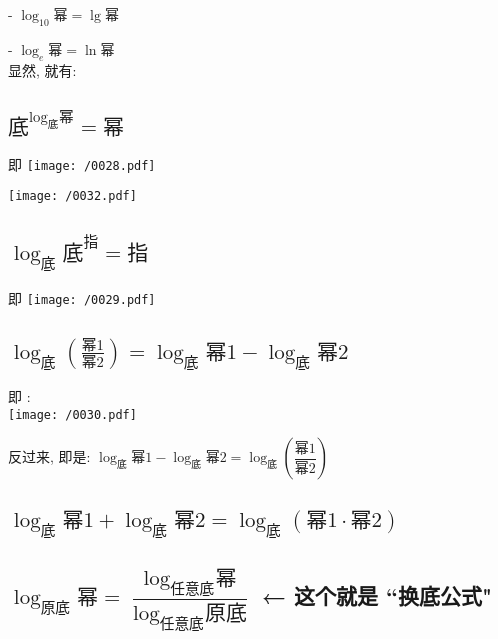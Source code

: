 \documentclass[UTF8]{ctexart}
\begin{document}
- $\log _{10}\text{幂}=\lg\text{幂}$

- $\log _e\text{幂}=\ln\text{幂}$ \\

显然, 就有:


\subsection{$\text{底}^{\log _{\text{底}}\text{幂}}=\text{幂}$}

即 
\texttt{[image: /0028.pdf]} \\


\begin{myEnvSample}
\texttt{[image: /0032.pdf]}
\end{myEnvSample}


\dotfill


\subsection{$\log _{\text{底}}\text{底}^{\text{指}}=\text{指}$}

即 
\texttt{[image: /0029.pdf]}


\dotfill



\subsection{$\log _{\text{底}}\left( \frac{\text{幂}1}{\text{幂}2} \right) =\log _{\text{底}}\text{幂}1-\log _{\text{底}}\text{幂}2$}

即 : \\
\texttt{[image: /0030.pdf]}


反过来, 即是:  $\log _{\text{底}}\text{幂}1-\log _{\text{底}}\text{幂}2=\log _{\text{底}}\left( \dfrac{\text{幂}1}{\text{幂}2} \right) $


\dotfill


\subsection{$\log _{\text{底}}\text{幂}1+\log _{\text{底}}\text{幂}2=\log _{\text{底}}\left( \text{幂}1\cdot \text{幂}2 \right) $}





\dotfill

\subsection{$\boxed{\log _{\text{原底}}\text{幂}=\dfrac{\log _{\text{任意底}}\text{幂}}{\log _{\text{任意底}}\text{原底}}}$ ← 这个就是 ``换底公式"}
\end{document}
